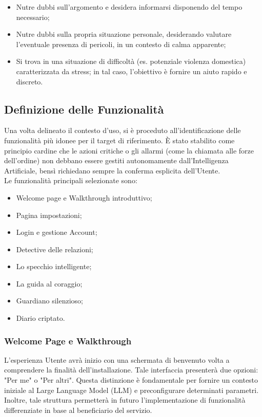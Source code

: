 \documentclass[a4paper,12pt]{article}
\begin{document}
\begin{itemize}
    \item Nutre dubbi sull'argomento e desidera informarsi disponendo del tempo necessario;
    \item Nutre dubbi sulla propria situazione personale, desiderando valutare l'eventuale presenza di pericoli, in un contesto di calma apparente;
    \item Si trova in una situazione di difficoltà (es. potenziale violenza domestica) caratterizzata da stress; in tal caso, l'obiettivo è fornire un aiuto rapido e discreto.
\end{itemize}

\subsection{Definizione delle Funzionalità}
Una volta delineato il contesto d'uso, si è proceduto all'identificazione delle funzionalità più idonee per il target di riferimento. È stato stabilito come principio cardine che le azioni critiche o gli allarmi (come la chiamata alle forze dell'ordine) non debbano essere gestiti autonomamente dall'Intelligenza Artificiale, bensì richiedano sempre la conferma esplicita dell'Utente. 
\\Le funzionalità principali selezionate sono:

\begin{itemize}
    \item Welcome page e Walkthrough introduttivo;
    \item Pagina impostazioni;
    \item Login e gestione Account;
    \item Detective delle relazioni;
    \item Lo specchio intelligente;
    \item La guida al coraggio;
    \item Guardiano silenzioso;
    \item Diario criptato.
\end{itemize}

\subsubsection{Welcome Page e Walkthrough}
L'esperienza Utente avrà inizio con una schermata di benvenuto volta a comprendere la finalità dell'installazione. Tale interfaccia presenterà due opzioni: "Per me" o "Per altri". Questa distinzione è fondamentale per fornire un contesto iniziale al Large Language Model (LLM) e preconfigurare determinati parametri. Inoltre, tale struttura permetterà in futuro l'implementazione di funzionalità differenziate in base al beneficiario del servizio.
\end{document}
